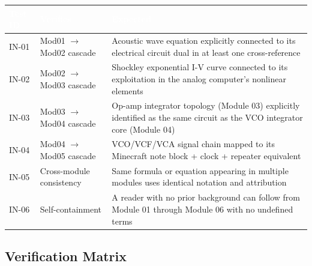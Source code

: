 \documentclass[11pt,letterpaper]{article}
\newcommand{\tableheader}[1]{\textbf{\sffamily\textcolor{white}{#1}}}
\begin{document}
\begin{center}
\begin{tabularx}{\textwidth}{C{1.5cm}L{4cm}X}
\toprule
{}
\tableheader{Test ID} & \tableheader{Verifies} & \tableheader{Expected} \\
\midrule
IN-01 & Mod01 $\to$ Mod02 cascade & Acoustic wave equation explicitly connected to its electrical circuit dual in at least one cross-reference \\
IN-02 & Mod02 $\to$ Mod03 cascade & Shockley exponential I-V curve connected to its exploitation in the analog computer's nonlinear elements \\
IN-03 & Mod03 $\to$ Mod04 cascade & Op-amp integrator topology (Module 03) explicitly identified as the same circuit as the VCO integrator core (Module 04) \\
IN-04 & Mod04 $\to$ Mod05 cascade & VCO/VCF/VCA signal chain mapped to its Minecraft note block + clock + repeater equivalent \\
IN-05 & Cross-module consistency & Same formula or equation appearing in multiple modules uses identical notation and attribution \\
IN-06 & Self-containment & A reader with no prior background can follow from Module 01 through Module 06 with no undefined terms \\
\bottomrule
\end{tabularx}
\end{center}

\subsection{Verification Matrix}
\end{document}
